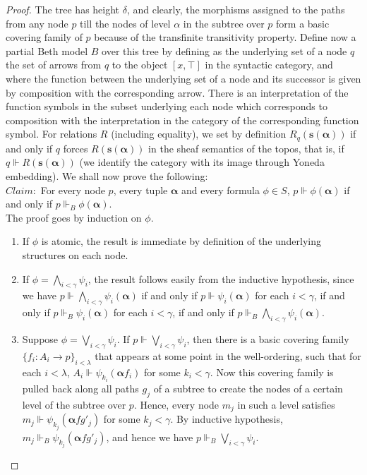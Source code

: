 \documentclass[a4paper,11pt]{article}
\theoremstyle{plain}
\theoremstyle{plain}
\theoremstyle{remark}
\begin{document}
\begin{proof}
 The tree has height $\delta$, and clearly, the morphisms assigned to the paths from any node $p$ till the nodes of level $\alpha$ in the subtree over $p$ form a basic covering family of $p$ because of the transfinite transitivity property. Define now a partial Beth model $B$ over this tree by defining as the underlying set of a node $q$ the set of arrows from $q$ to the object $[x, \top]$ in the syntactic category, and where the function between the underlying set of a node and its successor is given by composition with the corresponding arrow. There is an interpretation of the function symbols in the subset underlying each node which corresponds to composition with the interpretation in the category of the corresponding function symbol. For relations $R$ (including equality), we set by definition $R_q(\mathbf{s}(\boldsymbol{\alpha}))$ if and only if $q$ forces $R(\mathbf{s}(\boldsymbol{\alpha}))$ in the sheaf semantics of the topos, that is, if $q \Vdash R(\mathbf{s}(\boldsymbol{\alpha}))$ (we identify the category with its image through Yoneda embedding). We shall now prove the following:\\
 
$Claim:$ For every node $p$, every tuple $\boldsymbol{\alpha}$ and every formula $\phi \in S$, $p \Vdash \phi(\boldsymbol{\alpha})$ if and only if $p \Vdash_B \phi(\boldsymbol{\alpha})$.\\

The proof goes by induction on $\phi$.
 
 \begin{enumerate}
  \item If $\phi$ is atomic, the result is immediate by definition of the underlying structures on each node.
  
  \item If $\phi=\bigwedge_{i<\gamma}\psi_i$, the result follows easily from the inductive hypothesis, since we have $p \Vdash \bigwedge_{i<\gamma}\psi_i(\boldsymbol{\alpha})$ if and only if $p \Vdash \psi_i(\boldsymbol{\alpha})$ for each $i<\gamma$, if and only if $p \Vdash_B \psi_i(\boldsymbol{\alpha})$ for each $i<\gamma$, if and only if $p \Vdash_B \bigwedge_{i<\gamma}\psi_i(\boldsymbol{\alpha})$.
  
  \item Suppose $\phi= \bigvee_{i<\gamma} \psi_i$. If $p \Vdash \bigvee_{i<\gamma} \psi_i$, then there is a basic covering family $\{f_i: A_i \to p\}_{i<\lambda}$ that appears at some point in the well-ordering, such that for each $i<\lambda$, $A_i \Vdash \psi_{k_i}(\boldsymbol{\alpha} f_i)$ for some $k_i<\gamma$. Now this covering family is pulled back along all paths $g_j$ of a subtree to create the nodes of a certain level of the subtree over $p$. Hence, every node $m_j$ in such a level satisfies $m_j \Vdash \psi_{k_j}(\boldsymbol{\alpha} fg'_j)$ for some $k_j<\gamma$. By inductive hypothesis, $m_j \Vdash_B \psi_{k_j}(\boldsymbol{\alpha} fg'_j)$, and hence we have $p \Vdash_B \bigvee_{i<\gamma} \psi_i$.
  

\end{enumerate}
\end{proof}
\end{document}
